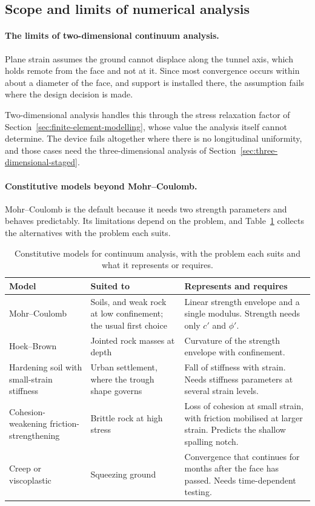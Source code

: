 \subsection{Scope and limits of numerical analysis}
\label{sec:scope-limits-numerical}

\paragraph{The limits of two-dimensional continuum analysis.}
Plane strain assumes the ground cannot displace along the tunnel axis, which
holds remote from the face and not at it. Since most convergence occurs
within about a diameter of the face, and support is installed there, the
assumption fails where the design decision is made.

Two-dimensional analysis handles this through the stress relaxation factor of
Section~\ref{sec:finite-element-modelling}, whose value the analysis itself
cannot determine. The device fails altogether where there is no longitudinal
uniformity, and those cases need the three-dimensional analysis of
Section~\ref{sec:three-dimensional-staged}.

\paragraph{Constitutive models beyond Mohr--Coulomb.}
Mohr--Coulomb is the default because it needs two strength parameters and
behaves predictably. Its limitations depend on the problem, and
Table~\ref{tab:constitutive-models} collects the alternatives with the
problem each suits.

\begin{table}[htbp]
\caption{Constitutive models for continuum analysis, with the problem each suits and what it represents or requires.}
\label{tab:constitutive-models}
\centering
\small
\begin{tabularx}{\textwidth}{>{\raggedright\arraybackslash}p{} >{\raggedright\arraybackslash}p{} X}
\toprule
\textbf{Model} & \textbf{Suited to} & \textbf{Represents and requires} \\
\midrule
Mohr--Coulomb & Soils, and weak rock at low confinement; the usual first choice & Linear strength envelope and a single modulus. Strength needs only $c'$ and $\phi'$. \\
Hoek--Brown & Jointed rock masses at depth & Curvature of the strength envelope with confinement. \\
Hardening soil with small-strain stiffness & Urban settlement, where the trough shape governs & Fall of stiffness with strain. Needs stiffness parameters at several strain levels. \\
Cohesion-weakening friction-strengthening & Brittle rock at high stress & Loss of cohesion at small strain, with friction mobilised at larger strain. Predicts the shallow spalling notch. \\
Creep or viscoplastic & Squeezing ground & Convergence that continues for months after the face has passed. Needs time-dependent testing. \\
\bottomrule
\end{tabularx}
\end{table}

